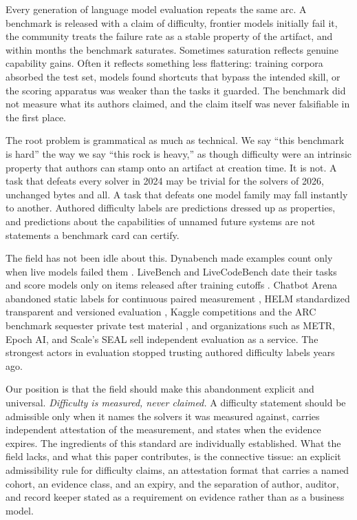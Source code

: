 \documentclass[11pt]{article}
\begin{document}
Every generation of language model evaluation repeats the same arc. A benchmark is released with a claim of difficulty, frontier models initially fail it, the community treats the failure rate as a stable property of the artifact, and within months the benchmark saturates. Sometimes saturation reflects genuine capability gains. Often it reflects something less flattering: training corpora absorbed the test set, models found shortcuts that bypass the intended skill, or the scoring apparatus was weaker than the tasks it guarded. The benchmark did not measure what its authors claimed, and the claim itself was never falsifiable in the first place.

The root problem is grammatical as much as technical. We say ``this benchmark is hard'' the way we say ``this rock is heavy,'' as though difficulty were an intrinsic property that authors can stamp onto an artifact at creation time. It is not. A task that defeats every solver in 2024 may be trivial for the solvers of 2026, unchanged bytes and all. A task that defeats one model family may fall instantly to another. Authored difficulty labels are predictions dressed up as properties, and predictions about the capabilities of unnamed future systems are not statements a benchmark card can certify.

The field has not been idle about this. Dynabench made examples count only when live models failed them \citep{kiela2021dynabench}. LiveBench and LiveCodeBench date their tasks and score models only on items released after training cutoffs \citep{white2024livebench, jain2024livecodebench}. Chatbot Arena abandoned static labels for continuous paired measurement \citep{chiang2024arena}, HELM standardized transparent and versioned evaluation \citep{liang2022helm}, Kaggle competitions and the ARC benchmark sequester private test material \citep{chollet2019measure}, and organizations such as METR, Epoch AI, and Scale's SEAL sell independent evaluation as a service. The strongest actors in evaluation stopped trusting authored difficulty labels years ago.

Our position is that the field should make this abandonment explicit and universal. \emph{Difficulty is measured, never claimed.} A difficulty statement should be admissible only when it names the solvers it was measured against, carries independent attestation of the measurement, and states when the evidence expires. The ingredients of this standard are individually established. What the field lacks, and what this paper contributes, is the connective tissue: an explicit admissibility rule for difficulty claims, an attestation format that carries a named cohort, an evidence class, and an expiry, and the separation of author, auditor, and record keeper stated as a requirement on evidence rather than as a business model.
\end{document}
